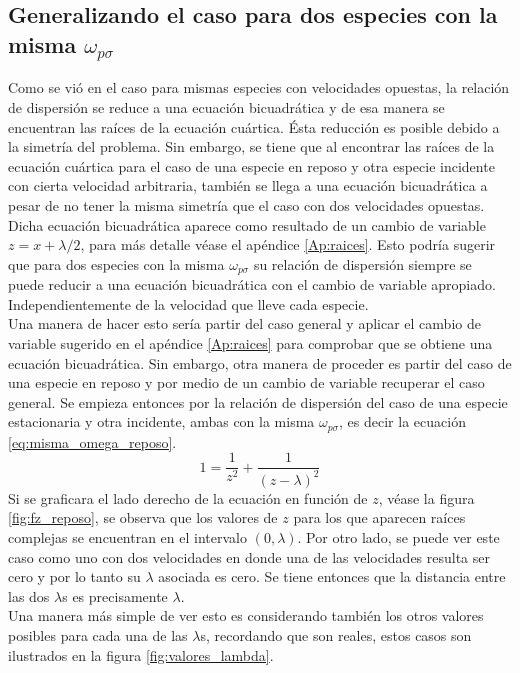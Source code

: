 \documentclass[12pt]{article}
\begin{document}
\subsection*{Generalizando el caso para dos especies con la misma $\omega_{p\sigma}$}
Como se vió en el caso para mismas especies con velocidades opuestas, la relación de dispersión se reduce a una ecuación bicuadrática y de esa manera se encuentran las raíces de la ecuación cuártica. Ésta reducción es posible debido a la simetría del problema. Sin embargo, se tiene que al encontrar las raíces de la ecuación cuártica para el caso de una especie en reposo y otra especie incidente con cierta velocidad arbitraria, también se llega a una ecuación bicuadrática a pesar de no tener la misma simetría que el caso con dos velocidades opuestas. Dicha ecuación bicuadrática aparece como resultado de un cambio de variable $z=x+\lambda /2$, para más detalle véase el apéndice \ref{Ap:raices}. Esto podría sugerir que para dos especies con la misma $\omega_{p\sigma}$ su relación de dispersión siempre se puede reducir a una ecuación bicuadrática con el cambio de variable apropiado. Independientemente de la velocidad que lleve cada especie.\\
Una manera de hacer esto sería partir del caso general y aplicar el cambio de variable sugerido en el apéndice \ref{Ap:raices} para comprobar que se obtiene una ecuación bicuadrática. Sin embargo, otra manera de proceder es partir del caso de una especie en reposo y por medio de un cambio de variable recuperar el caso general.
Se empieza entonces por la relación de dispersión del caso de una especie estacionaria y otra incidente, ambas con la misma $\omega_{p\sigma}$, es decir la ecuación \ref{eq:misma_omega_reposo}.
\begin{equation*}
1 = \frac{1}{z^2} + \frac{1}{(z-\lambda)^2}
\end{equation*}
Si se graficara el lado derecho de la ecuación en función de $z$, véase la figura \ref{fig:fz_reposo}, se observa que los valores de $z$ para los que aparecen raíces complejas se encuentran en el intervalo $(0, \lambda)$. Por otro lado, se puede ver este caso como uno con dos velocidades en donde una de las velocidades resulta ser cero y por lo tanto su $\lambda$ asociada es cero. Se tiene entonces que la distancia entre las dos $\lambda$s es precisamente $\lambda$.\\
Una manera más simple de ver esto es considerando también los otros valores posibles para cada una de las $\lambda$s, recordando que son reales, estos casos son ilustrados en la figura \ref{fig:valores_lambda}.
\end{document}
